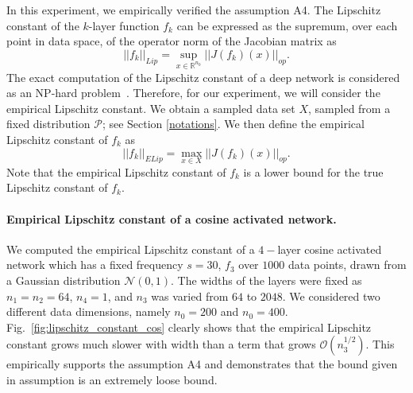 \documentclass{article}
\theoremstyle{plain}
\theoremstyle{definition}
\theoremstyle{remark}
\newcommand\R{\mathbb{R}}
\begin{document}
In this experiment, we empirically verified the assumption A4. The Lipschitz constant of the $k$-layer function $f_k$
can be expressed as the supremum, over each point in data space, of the operator norm of the Jacobian matrix as
\begin{equation*}
    \vert\vert f_k\vert\vert_{Lip} = \sup_{x \in \R^{n_0}}\vert\vert 
    J(f_k)(x)\vert\vert_{op}.
\end{equation*}
The exact computation of the Lipschitz constant of a deep network is considered as an NP-hard problem~\cite{virmaux2018lipschitz}. Therefore, for our experiment, we will consider the empirical Lipschitz constant. We obtain a sampled data set $X$, sampled from a fixed distribution $\mathcal{P}$; see Section \ref{notations}. 
We then define the empirical Lipschitz constant of $f_k$ as
\begin{equation*}
    \vert\vert f_k\vert\vert_{ELip} = \max_{x \in X}\vert\vert 
    J(f_k)(x)\vert\vert_{op}.
\end{equation*}
Note that the empirical Lipschitz constant of $f_k$ is a lower bound for the true Lipschitz constant of $f_k$.

\paragraph{Empirical Lipschitz constant of a cosine activated network.} We computed the empirical Lipschitz constant of a $4-$layer cosine activated network which has a fixed frequency $s=30$, $f_3$ over $1000$ data points, drawn from a Gaussian distribution
$\mathcal{N}(0, 1)$. 
The widths of the layers were fixed as $n_1 = n_2 = 64$, $n_4 = 1$, and $n_3$ was varied from $64$ to $2048$. We considered two different data dimensions, namely 
$n_0 = 200$ and $n_0 = 400$.
Fig.~\ref{fig:lipschitz_constant_cos} clearly shows that the empirical Lipschitz constant grows much slower with width than a term that grows $\mathcal{O}(n_3^{1/2})$. 
This empirically supports the assumption A4 and demonstrates that the bound given in assumption is an extremely loose bound.
\end{document}
